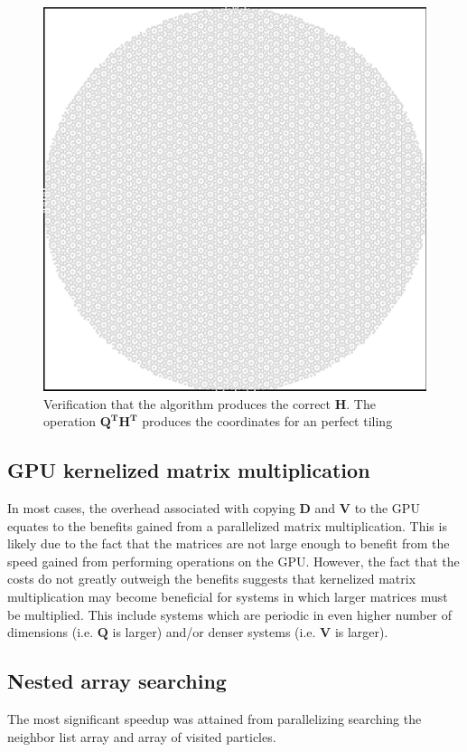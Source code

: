 \documentclass{article}
\begin{document}
\begin{figure}[htp!]
    \includegraphics[scale=0.3]{recontruction.png}
    \caption{Verification that the algorithm produces the correct $\mathbf{H}$. The operation $\mathbf{Q^TH^T}$ produces the coordinates for an perfect tiling}
    \label{fig:recontruction}
    \centering
\end{figure}

\subsection{GPU kernelized matrix multiplication}
In most cases, the overhead associated with copying $\mathbf{D}$ and $\mathbf{V}$ to the GPU equates to the benefits gained from a parallelized matrix multiplication. This is likely due to the fact that the matrices are not large enough to benefit from the speed gained from performing operations on the GPU. However, the fact that the costs do not greatly outweigh the benefits suggests that kernelized matrix multiplication may become beneficial for systems in which larger matrices must be multiplied. This include systems which are periodic in even higher number of dimensions (i.e. $\mathbf{Q}$ is larger) and/or denser systems (i.e. $\mathbf{V}$ is larger). 

\subsection{Nested array searching}
The most significant speedup was attained from parallelizing searching the neighbor list array and array of visited particles.
\end{document}
